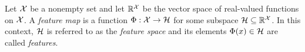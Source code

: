 Let \(\mathcal{X}\) be a nonempty set and let \(\mathbb{R}^{\mathcal{X}}\) be the vector space of real-valued functions on \(\mathcal{X}\).
A \textit{feature map} is a function \(\Phi : \mathcal{X} \to \mathcal{H}\) for some subspace \(\mathcal{H} \subseteq \mathbb{R}^{\mathcal{X}}\).
In this context, \(\mathcal{H}\) is referred to as the \textit{feature space} and its elements \(\Phi(x) \in \mathcal{H}\) are called \textit{features}.